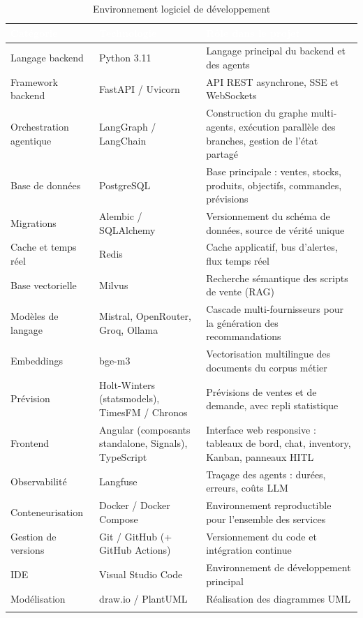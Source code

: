 \begin{longtable}{|P{3.4cm}|P{3.4cm}|P{7.2cm}|}
\hline
{}
\textcolor{white}{\textbf{Catégorie}} &
\textcolor{white}{\textbf{Technologie}} &
\textcolor{white}{\textbf{Rôle dans le projet}} \\
\hline
\endhead
\hline
\endfoot
\hline
\endlastfoot
Langage backend & Python 3.11 & Langage principal du backend et des agents \\
\hline
Framework backend & FastAPI / Uvicorn & API REST asynchrone, SSE et WebSockets \\
\hline
Orchestration agentique & LangGraph / LangChain & Construction du graphe multi-agents, exécution parallèle des branches, gestion de l'état partagé \\
\hline
Base de données & PostgreSQL & Base principale : ventes, stocks, produits, objectifs, commandes, prévisions \\
\hline
Migrations & Alembic / SQLAlchemy & Versionnement du schéma de données, source de vérité unique \\
\hline
Cache et temps réel & Redis & Cache applicatif, bus d'alertes, flux temps réel \\
\hline
Base vectorielle & Milvus & Recherche sémantique des scripts de vente (RAG) \\
\hline
Modèles de langage & Mistral, OpenRouter, Groq, Ollama & Cascade multi-fournisseurs pour la génération des recommandations \\
\hline
Embeddings & bge-m3 & Vectorisation multilingue des documents du corpus métier \\
\hline
Prévision & Holt-Winters (statsmodels), TimesFM / Chronos & Prévisions de ventes et de demande, avec repli statistique \\
\hline
Frontend & Angular (composants standalone, Signals), TypeScript & Interface web responsive : tableaux de bord, chat, inventory, Kanban, panneaux HITL \\
\hline
Observabilité & Langfuse & Traçage des agents : durées, erreurs, coûts LLM \\
\hline
Conteneurisation & Docker / Docker Compose & Environnement reproductible pour l'ensemble des services \\
\hline
Gestion de versions & Git / GitHub (+ GitHub Actions) & Versionnement du code et intégration continue \\
\hline
IDE & Visual Studio Code & Environnement de développement principal \\
\hline
Modélisation & draw.io / PlantUML & Réalisation des diagrammes UML \\
\hline
\caption{Environnement logiciel de développement}
\label{tab:env-logiciel-chap2}
\end{longtable}

